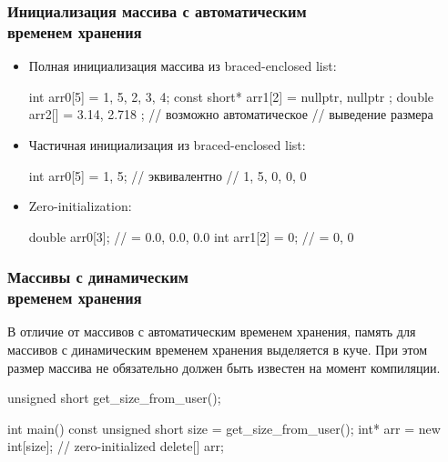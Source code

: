 \documentclass[compress, 8pt]{beamer}
\begin{document}
\begin{frame}[fragile]

    \frametitle{Инициализация массива с автоматическим \\ временем хранения}

    \begin{itemize}

        \item Полная инициализация массива из braced-enclosed list:

        \begin{myinplacelisting}[minted language=cpp]
int arr0[5] = {1, 5, 2, 3, 4};
const short* arr1[2] = { nullptr, nullptr };
double arr2[] = { 3.14, 2.718 }; // возможно автоматическое
                                 // выведение размера
        \end{myinplacelisting}

    \item Частичная инициализация из braced-enclosed list:

        \begin{myinplacelisting}[minted language=cpp]
int arr0[5] = {1, 5}; // эквивалентно
                      // {1, 5, 0, 0, 0}
        \end{myinplacelisting}

    \item Zero-initialization:

        \begin{myinplacelisting}[minted language=cpp]
double arr0[3]; // = { 0.0, 0.0, 0.0 }
int arr1[2] = {0}; // = { 0, 0 }
        \end{myinplacelisting}

    \end{itemize}

\end{frame}

\begin{frame}[fragile]

    \frametitle{Массивы с динамическим \\ временем хранения}

    В отличие от массивов с автоматическим временем хранения, память для массивов
    с динамическим временем хранения выделяется в куче.
    При этом размер массива не обязательно должен быть известен на момент
    компиляции.

    \begin{myinplacelisting}[minted language=cpp]
unsigned short get_size_from_user();

int main() {
    const unsigned short size = get_size_from_user();
    int* arr = new int[size]; // zero-initialized
    delete[] arr;
}
    \end{myinplacelisting}

\end{frame}
\end{document}
